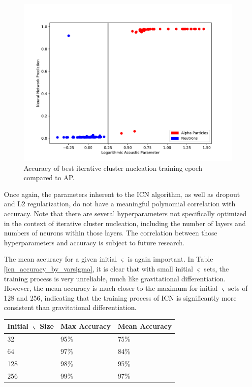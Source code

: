 \documentclass[10pt]{article}
\begin{document}
\begin{figure}[h]
    \centering
    \includegraphics[width=\textwidth]{icn_grid_search}
    \caption{\label{icn_grid_search} Accuracy of best iterative cluster nucleation training epoch compared to AP.}
\end{figure}

Once again, the parameters inherent to the ICN algorithm, as well as dropout and L2 regularization, do not have a meaningful polynomial correlation with accuracy. Note that there are several hyperparameters not specifically optimized in the context of iterative cluster nucleation, including the number of layers and numbers of neurons within those layers. The correlation between those hyperparameters and accuracy is subject to future research.

The mean accuracy for a given initial $\varsigma$ is again important. In Table \ref{icn_accuracy_by_varsigma}, it is clear that with small initial $\varsigma$ sets, the training process is very unreliable, much like gravitational differentiation. However, the mean accuracy is much closer to the maximum for initial $\varsigma$ sets of 128 and 256, indicating that the training process of ICN is significantly more consistent than gravitational differentiation.

\begin{minipage}{\textwidth}
    \begin{center}
         \label{icn_accuracy_by_varsigma}
        \begin{tabular}{|l|l|l|}
            \hline
            Initial $\varsigma$ Size & Max Accuracy & Mean Accuracy \\
            \hline
            32 & 95\% & 75\% \\
            \hline
            64 & 97\% & 84\% \\
            \hline
            128 & 98\% & 95\% \\
            \hline
            256 & 99\% & 97\% \\
            \hline
        \end{tabular}
    \end{center}
\end{minipage}
\end{document}
